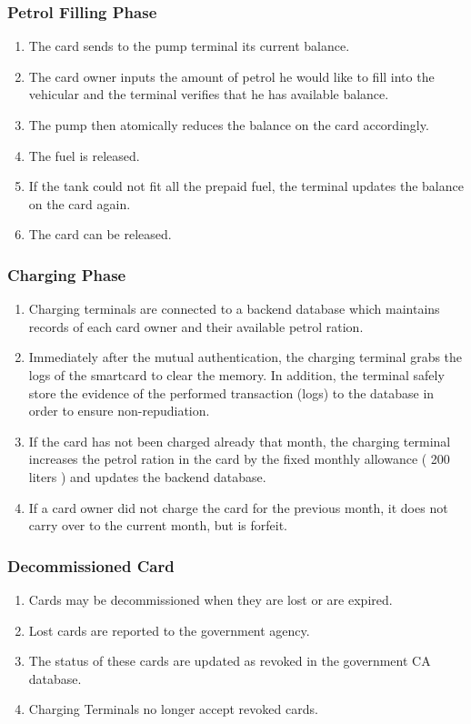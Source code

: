 \subsubsection{Petrol Filling Phase}
\begin{enumerate}
  \item The card sends to the pump terminal its current balance.
  \item The card owner inputs the amount of petrol he would like to fill into the vehicular and the terminal verifies that he has available balance.
  \item The pump then atomically reduces the balance on the card accordingly.
  \item The fuel is released.
  \item If the tank could not fit all the prepaid fuel, the terminal updates the balance on the card again.
  \item The card can be released.
\end{enumerate}

\subsubsection{Charging Phase}
\begin{enumerate}
  \item Charging terminals are connected to a backend database which maintains records of each card owner and their available petrol ration.
  \item Immediately after the mutual authentication, the charging terminal grabs the logs of the smartcard to clear the memory.  In addition, the terminal safely store the evidence of the performed transaction (logs) to the database in order to ensure non-repudiation.
  \item If the card has not been charged already that month, the charging terminal increases the petrol ration in the card by the fixed monthly allowance ( 200 liters ) and updates the backend database. 
  \item If a card owner did not charge the card for the previous month, it does not carry over to the current month, but is forfeit.
\end{enumerate}


\subsubsection{Decommissioned Card}

\begin{enumerate}
  \item Cards may be decommissioned when they are lost or are expired.
  \item Lost cards are reported to the government agency.
  \item The status of these cards are updated as revoked in the government CA database.
  \item Charging Terminals no longer accept revoked cards.
\end{enumerate}

